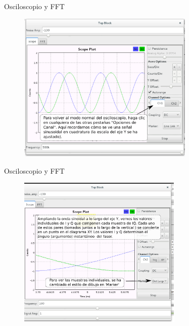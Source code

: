 \begin{frame}{Osciloscopio y FFT}
\begin{figure}[H]
\vspace{-3mm}
\centering
\includegraphics[width=0.75\textwidth]{parte1/lab2/pdf/lab2_14.pdf}
\end{figure}
\end{frame}

\begin{frame}{Osciloscopio y FFT}
\begin{figure}[H]
\vspace{-3mm}
\centering
\includegraphics[width=0.7\textwidth]{parte1/lab2/pdf/lab2_15.pdf}
\end{figure}
\end{frame}

